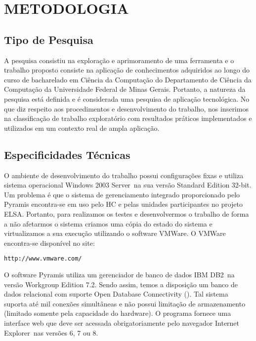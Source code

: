 \chapter{METODOLOGIA}

\section{Tipo de Pesquisa}

A pesquisa consistiu na exploração e aprimoramento de uma ferramenta e o trabalho proposto consiste na aplicação de conhecimentos adquiridos ao longo do curso de bacharelado em Ciência da Computação do Departamento de Ciência da Computação da Universidade Federal de Minas Gerais. Portanto, a natureza da pesquisa \cite{Jung2004} está definida e é considerada uma pesquisa de aplicação tecnológica. No que diz respeito aos procedimentos e desenvolvimento do trabalho, nos inserimos na classificação de trabalho exploratório com resultados práticos implementados e utilizados em um contexto real de ampla aplicação.



\section{Especificidades Técnicas}

O ambiente de desenvolvimento do trabalho possui configurações fixas e utiliza sistema operacional Windows 2003 Server\textcopyright\ na sua versão Standard Edition 32-bit. Um problema é que o sistema de gerenciamento integrado proporcionado pelo Pyramis encontra-se em uso pelo HC e pelas unidades participantes no projeto ELSA. Portanto, para realizamos os testes e desenvolvermos o trabalho de forma a não afetarmos o sistema criamos uma cópia do estado do sistema e virtualizamos a sua execução utilizando o software VMWare\textcopyright. O VMWare encontra-se disponível no site:
\begin{verbatim}
http://www.vmware.com/
\end{verbatim}

O software Pyramis \cite{Pyramis} utiliza um gerenciador de banco de dados IBM DB2\textcopyright\ na versão Workgroup Edition 7.2. Sendo assim, temos a disposição um banco de dados relacional com suporte Open Database Connectivity (). Tal sistema suporta até mil conexões simultâneas e não possui limitação de armazenamento (limitado somente pela capacidade do hardware). O programa fornece uma interface web que deve ser acessada obrigatoriamente pelo navegador Internet Explorer\textcopyright\ nas versões 6, 7 ou 8.

